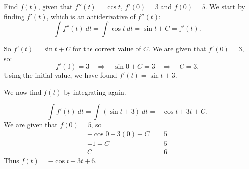 \begin{example}
Find $f(t)$, given that $f''(t) = \cos t$, $f'(0) = 3$ and $f(0) = 5$.
We start by finding $f'(t)$, which is an antiderivative of $f''(t)$:
\[ \int f''(t)\ dt = \int \cos t\ dt = \sin t + C = f'(t). \]
	
So $f'(t) = \sin t+C$ for the correct value of $C$. We are given that $f'(0) = 3$, so:
\[ f'(0) = 3 \quad \Rightarrow \quad \sin 0+C = 3 \quad \Rightarrow \quad C=3. \]
Using the initial value, we have found $f'(t) = \sin t+ 3.$
		
We now find $f(t)$ by integrating again.

\[ \int f'(t) \ dt = \int (\sin t+3)\ dt = -\cos t + 3t + C. \]
We are given that $f(0) = 5$, so
\begin{align*}
-\cos 0 + 3(0) + C &= 5 \\
-1 + C &= 5\\
C &= 6
\end{align*}
Thus $f(t) = -\cos t + 3t + 6$.
\end{example}